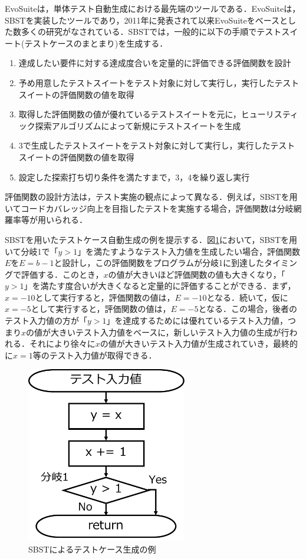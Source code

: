 \documentclass[12pt]{jarticle} %
\begin{document}
{\sf EvoSuite}\cite{EvoSuite}は，単体テスト自動生成における最先端のツールである．{\sf EvoSuite}は，SBSTを実装したツールであり，2011年に発表されて以来{\sf EvoSuite}をベースとした数多くの研究がなされている．SBSTでは，一般的に以下の手順でテストスイート(テストケースのまとまり)を生成する．

\begin{enumerate}
\item 達成したい要件に対する達成度合いを定量的に評価できる評価関数を設計
\item 予め用意したテストスイートをテスト対象に対して実行し，実行したテストスイートの評価関数の値を取得
\item 取得した評価関数の値が優れているテストスイートを元に，ヒューリスティック探索アルゴリズムによって新規にテストスイートを生成
\item 3で生成したテストスイートをテスト対象に対して実行し，実行したテストスイートの評価関数の値を取得
\item 設定した探索打ち切り条件を満たすまで，3，4を繰り返し実行
\end{enumerate}

評価関数の設計方法は，テスト実施の観点によって異なる．例えば，SBSTを用いてコードカバレッジ向上を目指したテストを実施する場合，評価関数は分岐網羅率等が用いられる．

SBSTを用いたテストケース自動生成の例を提示する．図\ref{SBST}において，SBSTを用いて分岐1で「$y > 1$」を満たすようなテスト入力値を生成したい場合，評価関数$E$を$E = b -1$と設計し，この評価関数をプログラムが分岐1に到達したタイミングで評価する．このとき，$x$の値が大きいほど評価関数の値も大きくなり，「$y > 1$」を満たす度合いが大きくなると定量的に評価することができる．まず，$x = -10$として実行すると，評価関数の値は，$E = -10$となる．続いて，仮に$x = -5$として実行すると，評価関数の値は，$E = -5$となる．この場合，後者のテスト入力値の方が「$y > 1$」を達成するためには優れているテスト入力値，つまり$x$の値が大きいテスト入力値をベースに，新しいテスト入力値の生成が行われる．それにより徐々に$x$の値が大きいテスト入力値が生成されていき，最終的に$x = 1$等のテスト入力値が取得できる．

\begin{figure}[htbp]
\begin{center}
\includegraphics[clip,width=7cm]{SBST.pdf}
\caption{SBSTによるテストケース生成の例}
\label{SBST}
\end{center}
\end{figure}
\end{document}
